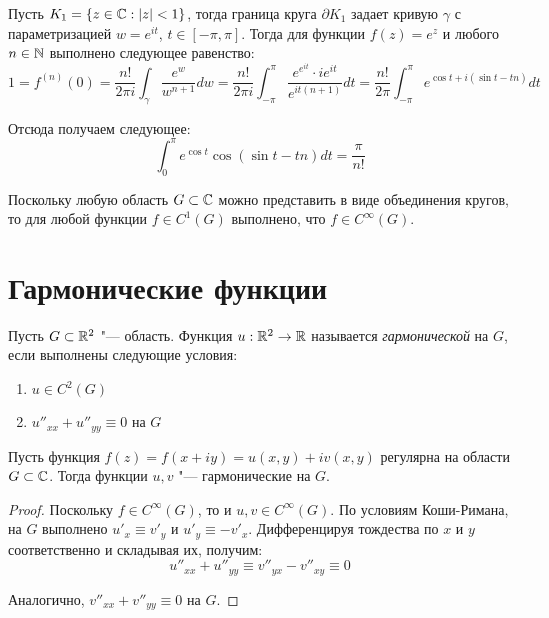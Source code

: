 \begin{example}
	Пусть $K_1 = \{z \in \mathbb{C}: |z| < 1\}$, тогда граница круга $\partial K_1$ задает кривую $\gamma$ с параметризацией $w = e^{it}$, $t \in [-\pi, \pi]$. Тогда для функции $f(z) = e^z$ и любого $n \in \mathbb{N}$ выполнено следующее равенство:
	\[1 = f^{(n)}(0) = \frac{n!}{2\pi i} \int_\gamma \frac{e^w}{w^{n+1}}dw = \frac{n!}{2\pi i} \int_{-\pi}^\pi \frac{e^{e^{it}}\cdot ie^{it}}{e^{it(n+1)}}dt = \frac{n!}{2\pi} \int_{-\pi}^\pi e^{\cos{t} + i(\sin{t} - tn)}dt\]
	
	Отсюда получаем следующее:
	\[\int_{0}^\pi e^{\cos{t}}\cos{(\sin{t} - tn)}dt = \frac\pi{n!}\]
\end{example}

\begin{note}
	Поскольку любую область $G \subset \mathbb{C}$ можно представить в виде объединения кругов, то для любой функции $f \in C^1(G)$ выполнено, что $f \in C^\infty(G)$.
\end{note}

\section{Гармонические функции}

\begin{definition}
	Пусть $G \subset \mathbb{R}^2$ "--- область. Функция $u : \mathbb{R}^2 \to \mathbb{R}$ называется \textit{гармонической} на $G$, если выполнены следующие условия:
	\begin{enumerate}
		\item $u \in C^2(G)$
		\item $u''_{xx} + u''_{yy} \equiv 0$ на $G$
	\end{enumerate}
\end{definition}

\begin{proposition}
	Пусть функция $f(z) = f(x + iy) = u(x, y) + iv(x, y)$ регулярна на области $G \subset \mathbb{C}$. Тогда функции $u, v$ "--- гармонические на $G$.
\end{proposition}

\begin{proof}
	Поскольку $f \in C^\infty(G)$, то и $u, v \in C^\infty(G)$. По условиям Коши-Римана, на $G$ выполнено $u'_x \equiv v'_y$ и $u'_y \equiv -v'_x$. Дифференцируя тождества по $x$ и $y$ соответственно и складывая их, получим:
	\[u''_{xx} + u''_{yy} \equiv v''_{yx} - v''_{xy} \equiv 0\]
	
	Аналогично, $v''_{xx} + v''_{yy} \equiv 0$ на $G$.
\end{proof}

